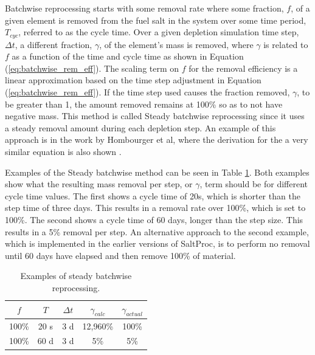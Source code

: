 Batchwise reprocessing starts with some removal rate where some fraction, $f$, of a given element is removed from the fuel salt in the system over some time period, $T_{cyc}$, referred to as the cycle time. Over a given depletion simulation time step, $\Delta t$, a different fraction, $\gamma$, of the element's mass is removed, where $\gamma$ is related to $f$ as a function of the time and cycle time as shown in Equation (\ref{eq:batchwise_rem_eff}). The scaling term on $f$ for the removal efficiency is a linear approximation based on the time step adjustment in Equation (\ref{eq:batchwise_rem_eff}). If the time step used causes the fraction removed, $\gamma$, to be greater than 1, the amount removed remains at 100\% so as to not have negative mass. This method is called Steady batchwise reprocessing since it uses a steady removal amount during each depletion step. An example of this approach is in the work by Hombourger et al, where the derivation for the a very similar equation is also shown \cite{hombourger_eql0d_2020}.

Examples of the Steady batchwise method can be seen in Table \ref{tab:example_steady_batchwise}. Both examples show what the resulting mass removal per step, or $\gamma$, term should be for different cycle time values. The first shows a cycle time of 20s, which is shorter than the step time of three days. This results in a removal rate over 100\%, which is set to 100\%. The second shows a cycle time of 60 days, longer than the step size. This results in a 5\% removal per step. An alternative approach to the second example, which is implemented in the earlier versions of SaltProc, is to perform no removal until 60 days have elapsed and then remove 100\% of material.

\begin{table}[H]
    \centering
    \begin{tabular}{c|c|c|c|c}
    $f$ & $T$ & $\Delta t$ & $\gamma_{calc}$ & $\gamma_{actual}$\\
    \hline
    \hline
    100\% & 20 s & 3 d & 12,960\% & 100\%\\
    100\% & 60 d & 3 d & 5\% & 5\%\\
    \end{tabular}
    \caption{Examples of steady batchwise reprocessing.}
    \label{tab:example_steady_batchwise}
\end{table}

